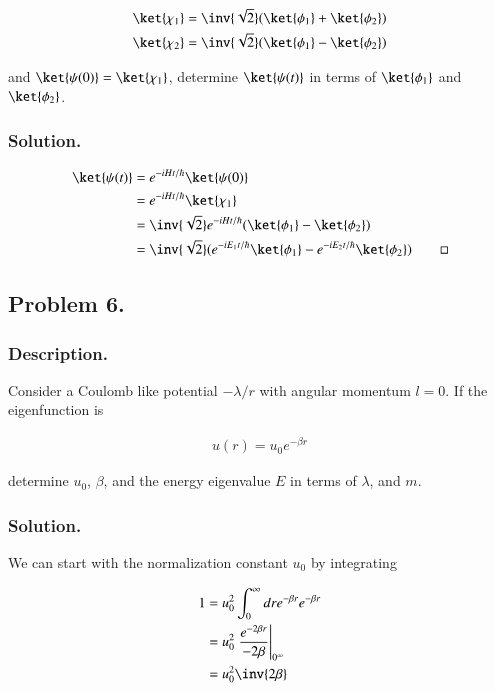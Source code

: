 \begin{align*}
\ket{\chi_1} &= \inv{\sqrt{2}}( \ket{\phi_1} +\ket{\phi_2}) \\
\ket{\chi_2} &= \inv{\sqrt{2}}( \ket{\phi_1} -\ket{\phi_2})
\end{align*}

and $\ket{\psi(0)} = \ket{\chi_1}$, determine $\ket{\psi(t)}$ in terms of $\ket{\phi_1}$ and $\ket{\phi_2}$.

\subsubsection{Solution. }

\begin{align*}
\ket{\psi(t)}
&= e^{-i H t /\hbar} \ket{\psi(0)} \\
&= e^{-i H t /\hbar} \ket{\chi_1} \\
&= \inv{\sqrt{2}} e^{-i H t /\hbar} ( \ket{\phi_1} -\ket{\phi_2}) \\
&= \inv{\sqrt{2}} (e^{-i E_1 t /\hbar} \ket{\phi_1} -e^{-i E_2 t /\hbar} \ket{\phi_2} )
\qquad\square
\end{align*}

\subsection{Problem 6. }
\subsubsection{Description. }

Consider a Coulomb like potential $-\lambda/r$ with angular momentum $l=0$.  If the eigenfunction is

\begin{align}\label{eqn:desaiCh3:700}
u(r) = u_0 e^{-\beta r}
\end{align}

determine $u_0$, $\beta$, and the energy eigenvalue $E$ in terms of $\lambda$, and $m$.

\subsubsection{Solution. }

We can start with the normalization constant $u_0$ by integrating

\begin{align*}
1 &= u_0^2 \int_0^\infty dr e^{-\beta r} e^{-\beta r}  \\
&=
u_0^2 \left. \frac{e^{-2 \beta r}}{-2 \beta} \right\vert_{0^\infty} \\
&= u_0^2 \inv{2\beta} \\
\end{align*}

